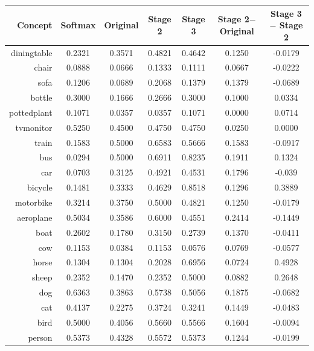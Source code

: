 \documentclass[11pt,a4paper]{article}
\begin{document}
\begin{table}[htbp]
\centering
\begin{tabular}{r|c|c|c|c|c|c}
Concept & Softmax & Original & Stage 2 & Stage 3 & \makecell{Stage 2$-$\\Original} & \makecell{Stage 3$-$\\Stage 2}\\\hline
diningtable   & 0.2321 & 0.3571 & 0.4821 & 0.4642 & 0.1250 & -0.0179\\
chair         & 0.0888 & 0.0666 & 0.1333 & 0.1111 & 0.0667 & -0.0222\\
sofa          & 0.1206 & 0.0689 & 0.2068 & 0.1379 & 0.1379 & -0.0689\\
bottle        & 0.3000 & 0.1666 & 0.2666 & 0.3000 & 0.1000 & 0.0334\\
pottedplant   & 0.1071 & 0.0357 & 0.0357 & 0.1071 & 0.0000 & 0.0714\\
tvmonitor     & 0.5250 & 0.4500 & 0.4750 & 0.4750 & 0.0250 & 0.0000\\
train         & 0.1583 & 0.5000 & 0.6583 & 0.5666 & 0.1583 & -0.0917\\
bus           & 0.0294 & 0.5000 & 0.6911 & 0.8235 & 0.1911 & 0.1324\\
car           & 0.0703 & 0.3125 & 0.4921 & 0.4531 & 0.1796 & -0.039\\
bicycle       & 0.1481 & 0.3333 & 0.4629 & 0.8518 & 0.1296 & 0.3889\\
motorbike     & 0.3214 & 0.3750 & 0.5000 & 0.4821 & 0.1250 & -0.0179\\
aeroplane     & 0.5034 & 0.3586 & 0.6000 & 0.4551 & 0.2414 & -0.1449\\
boat          & 0.2602 & 0.1780 & 0.3150 & 0.2739 & 0.1370 & -0.0411\\
cow           & 0.1153 & 0.0384 & 0.1153 & 0.0576 & 0.0769 & -0.0577\\
horse         & 0.1304 & 0.1304 & 0.2028 & 0.6956 & 0.0724 & 0.4928\\
sheep         & 0.2352 & 0.1470 & 0.2352 & 0.5000 & 0.0882 & 0.2648\\
dog           & 0.6363 & 0.3863 & 0.5738 & 0.5056 & 0.1875 & -0.0682\\
cat           & 0.4137 & 0.2275 & 0.3724 & 0.3241 & 0.1449 & -0.0483\\
bird          & 0.5000 & 0.4056 & 0.5660 & 0.5566 & 0.1604 & -0.0094\\
person        & 0.5373 & 0.4328 & 0.5572 & 0.5373 & 0.1244 & -0.0199\\\hline

\end{tabular}
\end{table}
\end{document}
